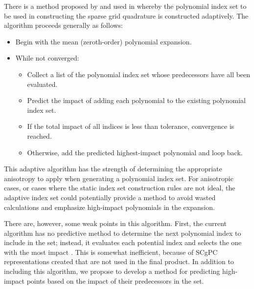 There is a method proposed by \cite{Gerstner} and used in \cite{Ayres} whereby the polynomial index set to be
used in constructing the sparse grid quadrature is constructed adaptively.  The algorithm proceeds generally
as follows:
\begin{itemize}
  \item Begin with the mean (zeroth-order) polynomial expansion.
  \item While not converged:
    \begin{itemize}
      \item Collect a list of the polynomial index set whose predecessors have all been evaluated.
      \item Predict the impact of adding each polynomial to the existing polynomial index set.
      \item If the total impact of all indices is less than tolerance, convergence is reached.
      \item Otherwise, add the predicted highest-impact polynomial and loop back.
    \end{itemize}
\end{itemize}
This adaptive algorithm has the strength of determining the appropriate anisotropy to apply when generating a
polynomial index set.  For anisotropic cases, or cases where the static index set construction rules are not
ideal, the adaptive index set could potentially provide a method to avoid wasted calculations and emphasize
high-impact polynomials in the expansion.

There are, however, some weak points in this algorithm.  First, the current algorithm has no predictive method
to determine the next polynomial index to include in the set; instead, it evaluates each potential index and
selects the one with the most impact \cite{Ayres}.  This is somewhat inefficient, because of SCgPC representations created
that are not used in the final product.  In addition to including this algorithm, we propose to develop a
method for predicting high-impact points based on the impact of their predecessors in the set.

